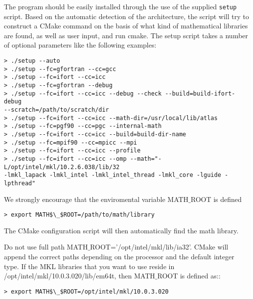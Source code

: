The program should be easily installed through the use of the supplied
\verb|setup| script. Based on the
automatic detection of the architecture, the
script will try to construct a CMake command on the
basis of what kind of mathematical libraries are found, as well as user input, and run cmake. 
The setup script takes a number of optional parameters like the following examples:
\begin{verbatim}
> ./setup --auto
> ./setup --fc=gfortran --cc=gcc
> ./setup --fc=ifort --cc=icc
> ./setup --fc=gfortran --debug
> ./setup --fc=ifort --cc=icc --debug --check --build=build-ifort-debug 
--scratch=/path/to/scratch/dir
> ./setup --fc=ifort --cc=icc --math-dir=/usr/local/lib/atlas
> ./setup --fc=pgf90 --cc=pgc --internal-math
> ./setup --fc=ifort --cc=icc --build=build-dir-name
> ./setup --fc=mpif90 --cc=mpicc --mpi
> ./setup --fc=ifort --cc=icc --profile
> ./setup --fc=ifort --cc=icc --omp --math="-L/opt/intel/mkl/10.2.6.038/lib/32 
-lmkl_lapack -lmkl_intel -lmkl_intel_thread -lmkl_core -lguide -lpthread"
\end{verbatim}
We strongly encourage that the enviromental variable MATH$\_$ROOT is defined
\begin{verbatim}
> export MATH$\_$ROOT=/path/to/math/library
\end{verbatim}
The CMake configuration script will then automatically find the math library. 

Do not use full path MATH$\_$ROOT='/opt/intel/mkl/lib/ia32'. CMake will append the
correct paths depending on the processor and the default integer type.  If the
MKL libraries that you want to use reside in
/opt/intel/mkl/10.0.3.020/lib/em64t, then MATH$\_$ROOT is defined as::
\begin{verbatim}
> export MATH$\_$ROOT=/opt/intel/mkl/10.0.3.020
\end{verbatim}

